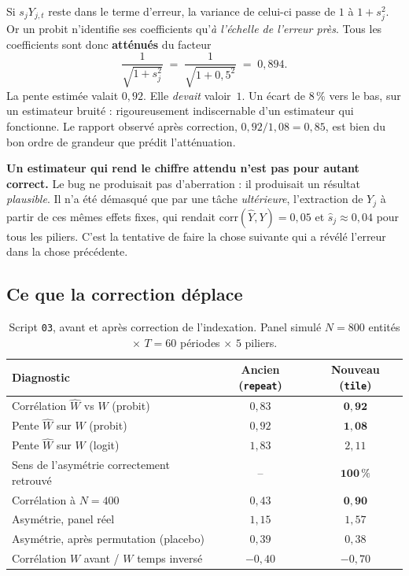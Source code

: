 \documentclass[11pt,a4paper]{article}
\newcommand{\Y}{Y}
\begin{document}
Si $s_j \Y_{j,t}$ reste dans le terme d'erreur, la variance de celui-ci passe de $1$ à
$1 + s_j^2$. Or un probit n'identifie ses coefficients qu'\emph{à l'échelle de l'erreur près}.
Tous les coefficients sont donc \textbf{atténués} du facteur
\begin{equation}
\frac{1}{\sqrt{1+s_j^{2}}} \;=\; \frac{1}{\sqrt{1+0{,}5^{2}}} \;=\; 0{,}894 .
\end{equation}
La pente estimée valait $0{,}92$. Elle \emph{devait} valoir~$1$. Un écart de $8\,\%$ vers le
bas, sur un estimateur bruité : rigoureusement indiscernable d'un estimateur qui fonctionne.
Le rapport observé après correction, $0{,}92 / 1{,}08 = 0{,}85$, est bien du bon ordre de
grandeur que prédit l'atténuation.

\begin{attention}
\textbf{Un estimateur qui rend le chiffre attendu n'est pas pour autant correct.} Le bug ne
produisait pas d'aberration : il produisait un résultat \emph{plausible}. Il n'a été démasqué
que par une tâche \emph{ultérieure}, l'extraction de $\Y_j$ à partir de ces mêmes effets
fixes, qui rendait $\mathrm{corr}(\hat{\Y}, \Y) = 0{,}05$ et $\hat{s}_j \approx 0{,}04$ pour
tous les piliers. C'est la tentative de faire la chose suivante qui a révélé l'erreur dans la
chose précédente.
\end{attention}

\subsection{Ce que la correction déplace}

\begin{table}[h]
\centering
\small
\caption{Script \texttt{03}, avant et après correction de l'indexation. Panel simulé
$N = 800$ entités $\times$ $T = 60$ périodes $\times$ $5$ piliers.}
\begin{tabular}{lcc}
\toprule
\textbf{Diagnostic} & \textbf{Ancien} (\texttt{repeat}) & \textbf{Nouveau} (\texttt{tile}) \\
\midrule
Corrélation $\hat W$ vs $W$ (probit)      & $0{,}83$  & $\mathbf{0{,}92}$ \\
Pente $\hat W$ sur $W$ (probit)           & $0{,}92$  & $\mathbf{1{,}08}$ \\
Pente $\hat W$ sur $W$ (logit)            & $1{,}83$  & $2{,}11$ \\
Sens de l'asymétrie correctement retrouvé & --        & $\mathbf{100\,\%}$ \\
\midrule
Corrélation à $N = 400$                   & $0{,}43$  & $\mathbf{0{,}90}$ \\
\midrule
Asymétrie, panel réel                     & $1{,}15$  & $1{,}57$ \\
Asymétrie, après permutation (placebo)    & $0{,}39$  & $0{,}38$ \\
Corrélation $W$ avant / $W$ temps inversé & $-0{,}40$ & $-0{,}70$ \\
\bottomrule
\end{tabular}
\end{table}
\end{document}
